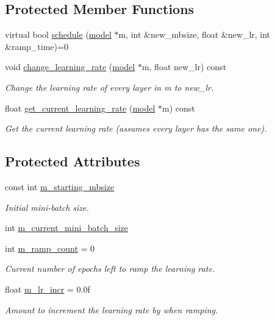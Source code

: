 \subsection*{Protected Member Functions}
\begin{DoxyCompactItemize}
\item 
virtual bool \hyperlink{classlbann_1_1lbann__callback__variable__minibatch_ace13e8941491ddd28ef35c277cecb1ad}{schedule} (\hyperlink{classlbann_1_1model}{model} $\ast$m, int \&new\+\_\+mbsize, float \&new\+\_\+lr, int \&ramp\+\_\+time)=0
\item 
void \hyperlink{classlbann_1_1lbann__callback__variable__minibatch_af078f30f9c206b89bdd542ce1fc6d2ad}{change\+\_\+learning\+\_\+rate} (\hyperlink{classlbann_1_1model}{model} $\ast$m, float new\+\_\+lr) const
\begin{DoxyCompactList}\small\item\em Change the learning rate of every layer in m to new\+\_\+lr. \end{DoxyCompactList}\item 
float \hyperlink{classlbann_1_1lbann__callback__variable__minibatch_a9de892c44231eadbbc7d27cfcc340ce2}{get\+\_\+current\+\_\+learning\+\_\+rate} (\hyperlink{classlbann_1_1model}{model} $\ast$m) const
\begin{DoxyCompactList}\small\item\em Get the current learning rate (assumes every layer has the same one). \end{DoxyCompactList}\end{DoxyCompactItemize}
\subsection*{Protected Attributes}
\begin{DoxyCompactItemize}
\item 
const int \hyperlink{classlbann_1_1lbann__callback__variable__minibatch_a8e1a314b320f6131d0eecbff69aeb2b8}{m\+\_\+starting\+\_\+mbsize}
\begin{DoxyCompactList}\small\item\em Initial mini-\/batch size. \end{DoxyCompactList}\item 
int \hyperlink{classlbann_1_1lbann__callback__variable__minibatch_a6488bd1f45110a1cb22553e5035003de}{m\+\_\+current\+\_\+mini\+\_\+batch\+\_\+size}
\item 
int \hyperlink{classlbann_1_1lbann__callback__variable__minibatch_a7beea78ef7107c88cb8782d3af618117}{m\+\_\+ramp\+\_\+count} = 0
\begin{DoxyCompactList}\small\item\em Current number of epochs left to ramp the learning rate. \end{DoxyCompactList}\item 
float \hyperlink{classlbann_1_1lbann__callback__variable__minibatch_ac78d3d357e1c16b3303cf358aee8a83d}{m\+\_\+lr\+\_\+incr} = 0.\+0f
\begin{DoxyCompactList}\small\item\em Amount to increment the learning rate by when ramping. \end{DoxyCompactList}\end{DoxyCompactItemize}


